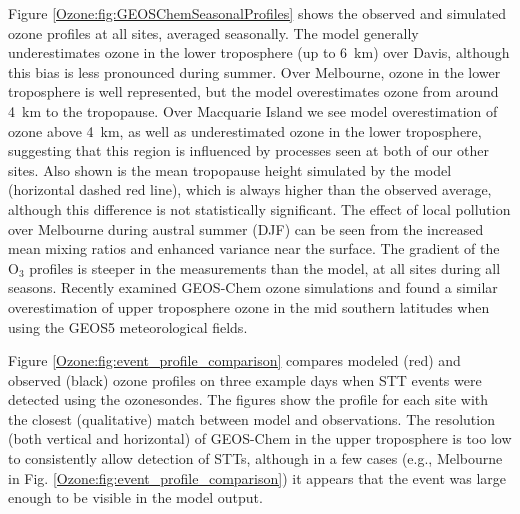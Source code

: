   Figure \ref{Ozone:fig:GEOSChemSeasonalProfiles} shows the observed and simulated ozone profiles at all sites, averaged seasonally.
  The model generally underestimates ozone in the lower troposphere (up to 6~km) over Davis, although this bias is less pronounced during summer.
  Over Melbourne, ozone in the lower troposphere is well represented, but the model overestimates ozone from around 4~km to the tropopause.
  Over Macquarie Island we see model overestimation of ozone above 4~km, as well as underestimated ozone in the lower troposphere, suggesting that this region is influenced by processes seen at both of our other sites.
  Also shown is the mean tropopause height simulated by the model (horizontal dashed red line), which is always higher than the observed average, although this difference is not statistically significant.
  The effect of local pollution over Melbourne during austral summer (DJF) can be seen from the increased mean mixing ratios and enhanced variance near the surface.
  The gradient of the O$_3$ profiles is steeper in the measurements than the model, at all sites during all seasons.
  Recently \cite{Hu2017} examined GEOS-Chem ozone simulations and found a similar overestimation of upper troposphere ozone in the mid southern latitudes when using the GEOS5 meteorological fields.
  
  Figure \ref{Ozone:fig:event_profile_comparison} compares modeled (red) and observed (black) ozone profiles on three example days when STT events were detected using the ozonesondes. 
  The figures show the profile for each site with the closest (qualitative) match between model and observations.
  The resolution (both vertical and horizontal) of GEOS-Chem in the upper troposphere is too low to consistently allow detection of STTs, although in a few cases (e.g., Melbourne in Fig. \ref{Ozone:fig:event_profile_comparison}) it appears that the event was large enough to be visible in the model output.
  
